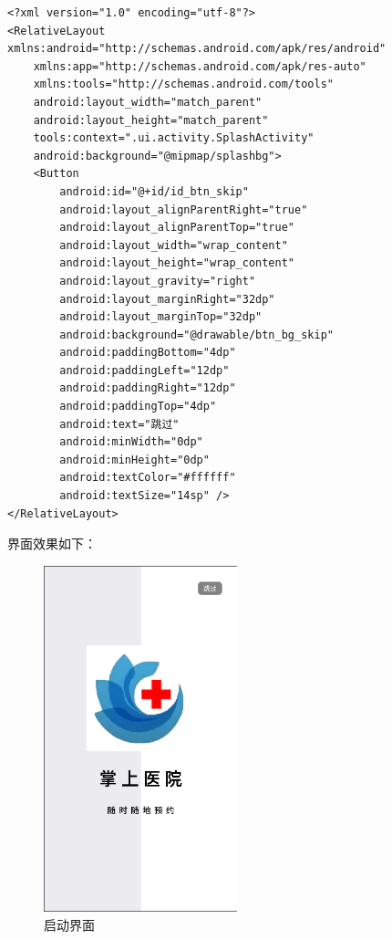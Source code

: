 \documentclass[UTF8,12pt]{article}
\begin{document}
\begin{lstlisting}
<?xml version="1.0" encoding="utf-8"?>
<RelativeLayout xmlns:android="http://schemas.android.com/apk/res/android"
    xmlns:app="http://schemas.android.com/apk/res-auto"
    xmlns:tools="http://schemas.android.com/tools"
    android:layout_width="match_parent"
    android:layout_height="match_parent"
    tools:context=".ui.activity.SplashActivity"
    android:background="@mipmap/splashbg">
    <Button
        android:id="@+id/id_btn_skip"
        android:layout_alignParentRight="true"
        android:layout_alignParentTop="true"
        android:layout_width="wrap_content"
        android:layout_height="wrap_content"
        android:layout_gravity="right"
        android:layout_marginRight="32dp"
        android:layout_marginTop="32dp"
        android:background="@drawable/btn_bg_skip"
        android:paddingBottom="4dp"
        android:paddingLeft="12dp"
        android:paddingRight="12dp"
        android:paddingTop="4dp"
        android:text="跳过"
        android:minWidth="0dp"
        android:minHeight="0dp"
        android:textColor="#ffffff"
        android:textSize="14sp" />
</RelativeLayout>
\end{lstlisting}

界面效果如下：

\begin{figure}[htbp]
    \centering
    \includegraphics[width=0.5\textwidth]{imgs/10.png}
    \caption{启动界面}
\end{figure}
\end{document}
